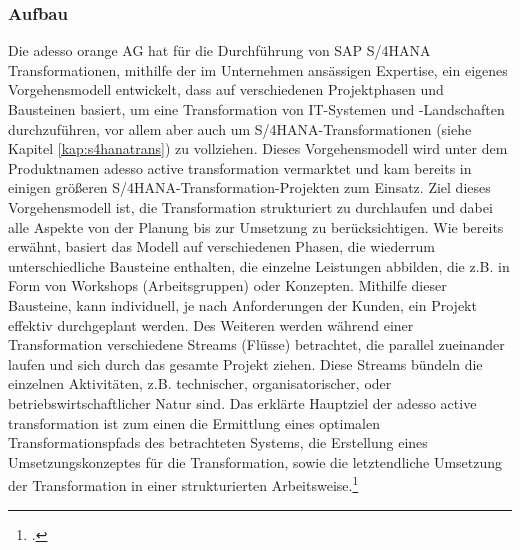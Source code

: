 \subsubsection{Aufbau}
Die adesso orange AG hat für die Durchführung von SAP S/4HANA Transformationen, mithilfe der im Unternehmen ansässigen Expertise, ein eigenes Vorgehensmodell entwickelt, dass auf verschiedenen Projektphasen und Bausteinen basiert, um eine Transformation von IT-Systemen und -Landschaften durchzuführen, vor allem aber auch um S/4HANA-Transformationen (siehe Kapitel \ref{kap:s4hanatrans}) zu vollziehen. Dieses Vorgehensmodell wird unter dem Produktnamen \glqq{}adesso active transformation\grqq{} vermarktet und kam bereits in einigen größeren S/4HANA-Transformation-Projekten zum Einsatz. Ziel dieses Vorgehensmodell ist, die Transformation strukturiert zu durchlaufen und dabei alle Aspekte von der Planung bis zur Umsetzung zu berücksichtigen. Wie bereits erwähnt, basiert das Modell auf verschiedenen Phasen, die wiederrum unterschiedliche Bausteine enthalten, die einzelne Leistungen abbilden, die z.B. in Form von Workshops (Arbeitsgruppen) oder Konzepten. Mithilfe dieser Bausteine, kann individuell, je nach Anforderungen der Kunden, ein Projekt effektiv durchgeplant werden. Des Weiteren werden während einer Transformation verschiedene \glqq{}Streams\grqq{} (Flüsse) betrachtet, die parallel zueinander laufen und sich durch das gesamte Projekt ziehen. Diese Streams bündeln die einzelnen Aktivitäten, z.B. technischer, organisatorischer, oder betriebswirtschaftlicher Natur sind. Das erklärte Hauptziel der \glqq{}adesso active transformation\grqq{} ist zum einen die Ermittlung eines optimalen Transformationspfads des betrachteten Systems, die Erstellung eines Umsetzungskonzeptes für die Transformation, sowie die letztendliche Umsetzung der Transformation in einer strukturierten Arbeitsweise.\footcite[Vgl.][]{aat-vorgehensmodell}

